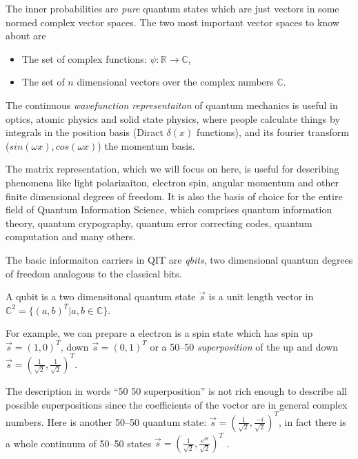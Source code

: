 \documentclass[aps,11pt,twoside,letterpaper]{article}
\def\c{\mathbb{C}}
\begin{document}
        The inner probabilities are \emph{pure} quantum states 
        which are just vectors in some normed complex vector spaces.
        The two most important vector spaces to know about are  
        \begin{itemize}
            \item   The set of complex functions: $\psi \colon \mathbb{R} \to \mathbb{C} $,
            \item   The set of $n$ dimensional vectors over the complex numbers $\c$.
        \end{itemize}
        The continuous \emph{wavefunction representaiton} of quantum mechanics is useful in optics,
        atomic physics and solid state physics, where people calculate things by integrals in 
        the position basis (Diract $\delta(x)$ functions),
        and its fourier transform ($sin(\omega x),cos(\omega x)$) the momentum basis.

        The matrix representation, which we will focus on here,  is useful for describing 
        phenomena like light polarizaiton, electron spin, angular momentum and other 
        finite dimensional degrees of freedom.
        It is also the basis of choice for the entire field of Quantum Information Science,
        which comprises quantum information theory, quantum crypography, quantum error correcting codes, 
        quantum computation and many others.

        The basic informaiton carriers in QIT are \emph{qbits}, two dimensional quantum degrees
        of freedom analogous to the classical bits. 

        \begin{definition}[qubit]
            A qubit is a two dimensitonal quantum state $\vec{s}$ is a 
            unit length vector in $\c^2 = \{(a,b)^T| a,b \in \c\}$.
        \end{definition}

        For example, we can prepare a electron is a spin state which has spin up $\vec{s}=(1,0)^T$,
        down $\vec{s}=(0,1)^T$ or a 50--50 \emph{superposition} of the up and down $\vec{s} = (\frac{1}{\sqrt{2}}, \frac{1}{\sqrt{2}})^T$.

        The description in words ``50 50 superposition'' is not rich enough to describe all possible superpositions since
        the coefficients of the voctor are in general complex numbers. 
        Here is another 50--50 quantum state: $\vec{s} = (\frac{1}{\sqrt{2}}, \frac{-i}{\sqrt{2}})^T$, in fact there is a
        whole continuum of 50--50  states $\vec{s} = (\frac{1}{\sqrt{2}}, \frac{e^{i\theta}}{\sqrt{2}})^T$ .
\end{document}
